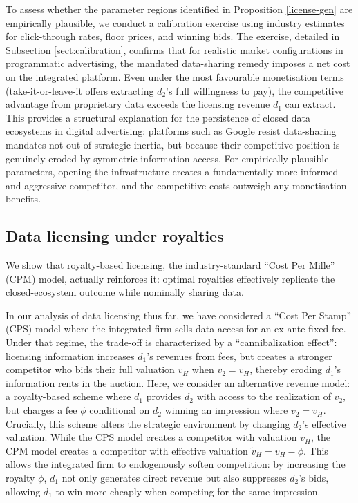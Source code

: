 \documentclass[11pt]{article}
\theoremstyle{plain}
\theoremstyle{definition}
\theoremstyle{plain}
\theoremstyle{plain}
\theoremstyle{plain}
\theoremstyle{plain}
\numberwithin{equation}{section}
\begin{document}
\noindent To assess whether the parameter regions identified in Proposition \ref{license-gen} are empirically plausible, we conduct a calibration exercise using industry estimates for click-through rates, floor prices, and winning bids. The exercise, detailed in Subsection \ref{sect:calibration}, confirms that for realistic market configurations in programmatic advertising, the mandated data-sharing remedy imposes a net cost on the integrated platform. Even under the most favourable monetisation terms (take-it-or-leave-it offers extracting $d_2$'s full willingness to pay), the competitive advantage from proprietary data exceeds the licensing revenue $d_1$ can extract. This provides a structural explanation for the persistence of closed data ecosystems in digital advertising: platforms such as Google resist data-sharing mandates not out of strategic inertia, but because their competitive position is genuinely eroded by symmetric information access. For empirically plausible parameters, opening the infrastructure creates a fundamentally more informed and aggressive competitor, and the competitive costs outweigh any monetisation benefits.\par
\vspace{4mm}


\iffalse
\subsection{Data licensing under royalties}
We show that royalty-based licensing, the industry-standard ``Cost Per Mille'' (CPM) model, actually reinforces it: optimal royalties effectively replicate the closed-ecosystem outcome while nominally sharing data.\par
\vspace{2mm}

\noindent In our analysis of data licensing thus far, we have considered a ``Cost Per Stamp'' (CPS) model where the integrated firm sells data access for an ex-ante fixed fee. Under that regime, the trade-off is characterized by a ``cannibalization effect'': licensing information increases $d_1$'s revenues from fees, but creates a stronger competitor who bids their full valuation $v_H$ when $v_2=v_H$, thereby eroding $d_1$'s information rents in the auction. Here, we consider an alternative revenue model: a royalty-based scheme where $d_1$ provides $d_2$ with access to the realization of $v_2$, but charges a fee $\phi$ conditional on $d_2$ winning an impression where $v_2=v_H$. Crucially, this scheme alters the strategic environment by changing $d_2$'s effective valuation. While the CPS model creates a competitor with valuation $v_H$, the CPM model creates a competitor with effective valuation $\tilde{v}_H = v_H - \phi$. This allows the integrated firm to endogenously soften competition: by increasing the royalty $\phi$, $d_1$ not only generates direct revenue but also suppresses $d_2$'s bids, allowing $d_1$ to win more cheaply when competing for the same impression.
\end{document}

